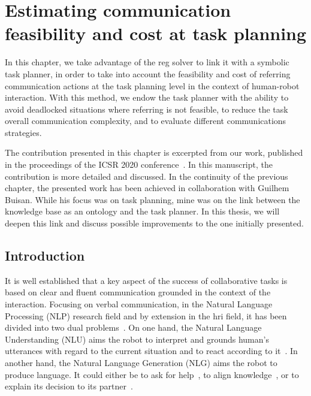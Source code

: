 \ifdefined{}
\else
\setcounter{chapter}{5} %
\dominitoc
\faketableofcontents
\fi

\chapter{Estimating communication feasibility and cost at task planning}
\label{chap:5}
\minitoc

In this chapter, we take advantage of the \acrshort{reg} solver to link it with a symbolic task planner, in order to take into account the feasibility and cost of referring communication actions at the task planning level in the context of human-robot interaction. With this method, we endow the task planner with the ability to avoid deadlocked situations where referring is not feasible, to reduce the task overall communication complexity, and to evaluate different communications strategies.

The contribution presented in this chapter is excerpted from our work, published in the proceedings of the ICSR 2020 conference~\cite{buisan_2020_human}. In this manuscript, the contribution is more detailed and discussed. In the continuity of the previous chapter, the presented work has been achieved in collaboration with Guilhem Buisan. While his focus was on task planning, mine was on the link between the knowledge base as an ontology and the task planner. In this thesis, we will deepen this link and discuss possible improvements to the one initially presented.

\section{Introduction}

It is well established that a key aspect of the success of collaborative tasks is based on clear and fluent communication grounded in the context of the interaction. Focusing on verbal communication, in the Natural Language Processing (NLP) research field and by extension in the \acrfull{hri} field, it has been divided into two dual problems~\cite{tellex_2020_robots}. On one hand, the Natural Language Understanding (NLU) aims the robot to interpret and grounds human's utterances with regard to the current situation and to react according to it~\cite{brawer_2018_situated}. In another hand, the Natural Language Generation (NLG) aims the robot to produce language. It could either be to ask for help~\cite{tellex_2014_asking}, to align knowledge~\cite{devin_2016_implemented}, or to explain its decision to its partner~\cite{roncone_2017_transparent}.

